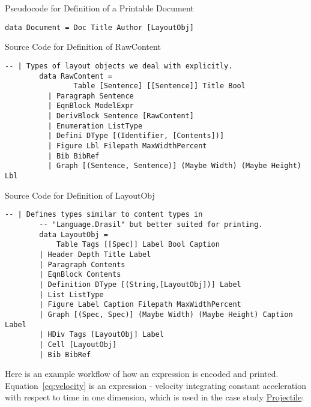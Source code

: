 \begin{listing}[h]
	\caption{Pseudocode for Definition of a Printable Document}
	\label{code:Document}
	\begin{lstlisting}[language=haskell1]
		data Document = Doc Title Author [LayoutObj]
	\end{lstlisting}
\end{listing}

\begin{listing}[h]
	\caption{Source Code for Definition of RawContent}
	\label{code:RawContent}
	\begin{lstlisting}[language=haskell1]
		-- | Types of layout objects we deal with explicitly.
		data RawContent =
				Table [Sentence] [[Sentence]] Title Bool
		  | Paragraph Sentence                       
		  | EqnBlock ModelExpr                      
		  | DerivBlock Sentence [RawContent]        
		  | Enumeration ListType                    
		  | Defini DType [(Identifier, [Contents])] 
		  | Figure Lbl Filepath MaxWidthPercent     
		  | Bib BibRef                              
		  | Graph [(Sentence, Sentence)] (Maybe Width) (Maybe Height) Lbl
	\end{lstlisting}
\end{listing}

\begin{listing}[h]
	\caption{Source Code for Definition of LayoutObj}
	\label{code:LayoutObj}
	\begin{lstlisting}[language=haskell1]
		-- | Defines types similar to content types in 
		-- "Language.Drasil" but better suited for printing.
		data LayoutObj = 
			Table Tags [[Spec]] Label Bool Caption                          
		| Header Depth Title Label                                       
		| Paragraph Contents                                              
		| EqnBlock Contents                                               
		| Definition DType [(String,[LayoutObj])] Label                   
		| List ListType                                                   
		| Figure Label Caption Filepath MaxWidthPercent                  
		| Graph [(Spec, Spec)] (Maybe Width) (Maybe Height) Caption Label 
		| HDiv Tags [LayoutObj] Label                                    
		| Cell [LayoutObj] 
		| Bib BibRef         
	\end{lstlisting}
\end{listing}

Here is an example workflow of how an expression is encoded and printed. 
Equation~\ref{eq:velocity} is an expression - velocity integrating constant 
acceleration with respect to time in one dimension, which is used in the case 
study 
\href{https://jacquescarette.github.io/Drasil/examples/projectile/SRS/srs/Projectile_SRS.html}{Projectile}:
 
